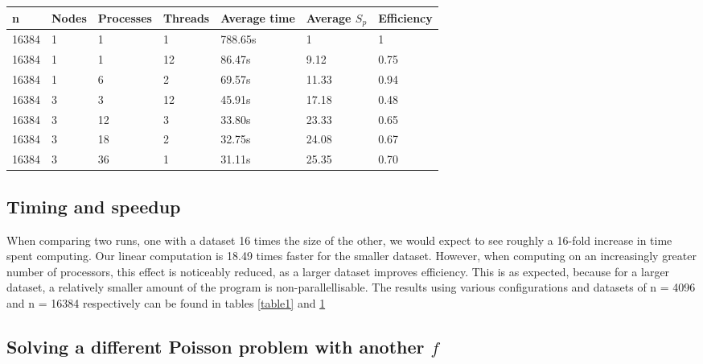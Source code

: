 \begin{table}[h]
   \centering
    \begin{tabular}{| l | l | l | l | l | l | l |}
    \hline
    \bf{n} & \bf{Nodes} & \bf{Processes} &\bf{Threads} & \bf{Average time} & \bf{Average }$S_{p}$ & \bf{Efficiency} \\ \hline
    	16384 & 1 & 1 & 1 & 788.65s & 1 & 1 \\ \hline
	16384 & 1 & 1 & 12 & 86.47s & 9.12 & 0.75 \\ \hline
	16384 & 1 & 6 & 2 & 69.57s & 11.33 & 0.94 \\ \hline
	16384 & 3 & 3 & 12 & 45.91s & 17.18 & 0.48 \\ \hline
	16384 & 3 & 12 & 3 & 33.80s & 23.33 & 0.65 \\ \hline
	16384 & 3 & 18 & 2 & 32.75s & 24.08 & 0.67 \\ \hline	
	16384 & 3 & 36 & 1 & 31.11s & 25.35 & 0.70  \\ \hline
    \end{tabular}
	\label{table2}
\end{table}



\subsection{Timing and speedup}
When comparing two runs, one with a dataset 16 times the size of the other, we would expect to see roughly a 16-fold increase in time spent computing. Our linear computation is 18.49 times faster for the smaller dataset. However, when computing on an increasingly greater number of processors, this effect is noticeably reduced, as a larger dataset improves efficiency. This is as expected, because for a larger dataset, a relatively smaller amount of the program is non-parallellisable. The results using various configurations and datasets of n = 4096 and n = 16384 respectively can be found in tables \ref{table1} and \ref{table2}

\subsection{Solving a different Poisson problem with another $f$}